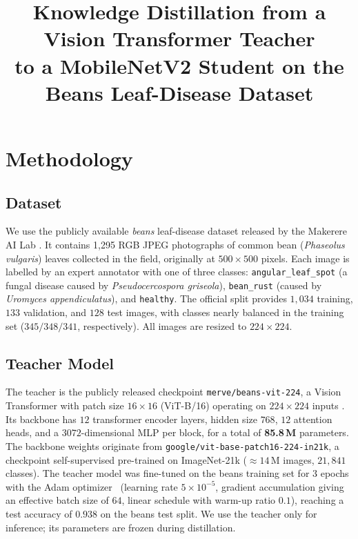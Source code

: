 \documentclass[11pt]{article}
\title{Knowledge Distillation from a Vision Transformer Teacher\\
       to a MobileNetV2 Student on the Beans Leaf-Disease Dataset}
\author{}
\date{}
\begin{document}
\maketitle

\section{Methodology}

\subsection{Dataset}
We use the publicly available \emph{beans} leaf-disease dataset released by
the Makerere AI Lab \cite{mugalu2022makerere}.  It contains
1{,}295 RGB JPEG photographs of common bean (\emph{Phaseolus vulgaris}) leaves
collected in the field, originally at $500\times500$ pixels.  Each image is
labelled by an expert annotator with one of three classes:
\texttt{angular\_leaf\_spot} (a fungal disease caused by
\emph{Pseudocercospora griseola}), \texttt{bean\_rust} (caused by
\emph{Uromyces appendiculatus}), and \texttt{healthy}.  The official split
provides $1{,}034$ training, $133$ validation, and $128$ test images, with
classes nearly balanced in the training set ($345 / 348 / 341$, respectively).
All images are resized to $224\times224$.

\subsection{Teacher Model}
The teacher is the publicly released checkpoint
\texttt{merve/beans-vit-224}, a Vision Transformer with patch size
$16\times16$ (ViT-B/16) operating on $224\times224$ inputs
\cite{dosovitskiy2021vit}.  Its backbone has $12$ transformer encoder layers,
hidden size $768$, $12$ attention heads, and a $3072$-dimensional MLP per
block, for a total of \textbf{85.8\,M} parameters.  The backbone weights
originate from \texttt{google/vit-base-patch16-224-in21k}, a checkpoint
self-supervised pre-trained on \mbox{ImageNet-21k} ($\approx 14$\,M images,
$21{,}841$ classes).  The teacher model was fine-tuned on the beans
training set for $3$ epochs with the Adam optimizer~\cite{kingma2015adam}
(learning rate $5\times10^{-5}$, gradient accumulation giving an effective
batch size of $64$, linear schedule with warm-up ratio $0.1$), reaching a
test accuracy of $0.938$ on the beans test split.  We use the teacher only
for inference; its parameters are frozen during distillation.
\end{document}
